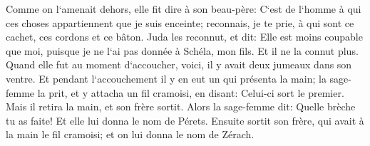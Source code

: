 \verse Comme on l`amenait dehors, elle fit dire à son beau-père: C`est de l`homme à qui ces choses appartiennent que je suis enceinte; reconnais, je te prie, à qui sont ce cachet, ces cordons et ce bâton. 
\verse Juda les reconnut, et dit: Elle est moins coupable que moi, puisque je ne l`ai pas donnée à Schéla, mon fils. Et il ne la connut plus. 
\verse Quand elle fut au moment d`accoucher, voici, il y avait deux jumeaux dans son ventre. 
\verse Et pendant l`accouchement il y en eut un qui présenta la main; la sage-femme la prit, et y attacha un fil cramoisi, en disant: Celui-ci sort le premier. 
\verse Mais il retira la main, et son frère sortit. Alors la sage-femme dit: Quelle brèche tu as faite! Et elle lui donna le nom de Pérets. 
\verse Ensuite sortit son frère, qui avait à la main le fil cramoisi; et on lui donna le nom de Zérach. 

\chapter{}

